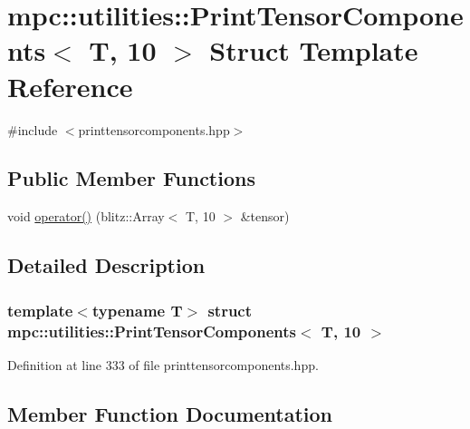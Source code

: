 \hypertarget{structmpc_1_1utilities_1_1_print_tensor_components_3_01_t_00_0110_01_4}{}\section{mpc\+:\+:utilities\+:\+:Print\+Tensor\+Components$<$ T, 10 $>$ Struct Template Reference}
\label{structmpc_1_1utilities_1_1_print_tensor_components_3_01_t_00_0110_01_4}


{\ttfamily \#include $<$printtensorcomponents.\+hpp$>$}

\subsection*{Public Member Functions}
\begin{DoxyCompactItemize}
\item 
void \mbox{\hyperlink{structmpc_1_1utilities_1_1_print_tensor_components_3_01_t_00_0110_01_4_a68d6aead6f1d8a3f3bd91ec2bda85c2e}{operator()}} (blitz\+::\+Array$<$ T, 10 $>$ \&tensor)
\end{DoxyCompactItemize}


\subsection{Detailed Description}
\subsubsection*{template$<$typename T$>$\newline
struct mpc\+::utilities\+::\+Print\+Tensor\+Components$<$ T, 10 $>$}



Definition at line 333 of file printtensorcomponents.\+hpp.



\subsection{Member Function Documentation}
\mbox{\label{structmpc_1_1utilities_1_1_print_tensor_components_3_01_t_00_0110_01_4_a68d6aead6f1d8a3f3bd91ec2bda85c2e}} 
